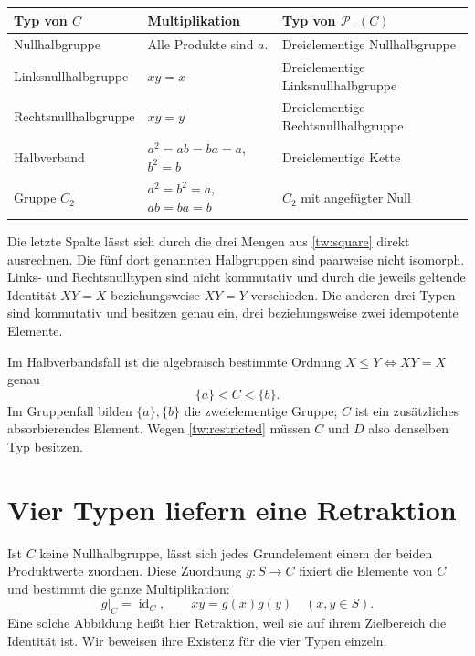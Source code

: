 \documentclass[a4paper,11pt]{article}
\newcommand{\Pp}[1]{\mathcal P_+(#1)}
\begin{document}
\begin{center}
\small
\begin{tabularx}{\linewidth}{@{}l X X@{}}
\toprule
Typ von \(C\) & Multiplikation & Typ von \(\Pp C\) \\
\midrule
Nullhalbgruppe & Alle Produkte sind \(a\).
 & Dreielementige Nullhalbgruppe \\
Linksnullhalbgruppe & \(xy=x\)
 & Dreielementige Linksnullhalbgruppe \\
Rechtsnullhalbgruppe & \(xy=y\)
 & Dreielementige Rechtsnullhalbgruppe \\
Halbverband & \(a^2=ab=ba=a\), \(b^2=b\)
 & Dreielementige Kette \\
Gruppe \(C_2\) & \(a^2=b^2=a\), \(ab=ba=b\)
 & \(C_2\) mit angefügter Null \\
\bottomrule
\end{tabularx}
\end{center}

Die letzte Spalte lässt sich durch die drei Mengen aus
\eqref{tw:square} direkt ausrechnen. Die fünf dort genannten
Halbgruppen sind paarweise nicht isomorph. Links- und Rechtsnulltypen
sind nicht kommutativ und durch die jeweils geltende Identität
\(XY=X\) beziehungsweise \(XY=Y\) verschieden. Die anderen drei
Typen sind kommutativ und besitzen genau ein, drei beziehungsweise
zwei idempotente Elemente.

Im Halbverbandsfall ist die algebraisch bestimmte Ordnung
\(X\le Y\iff XY=X\) genau
\[
 \{a\}<C<\{b\}.
\]
Im Gruppenfall bilden \(\{a\},\{b\}\) die zweielementige Gruppe;
\(C\) ist ein zusätzliches absorbierendes Element. Wegen
\eqref{tw:restricted} müssen \(C\) und \(D\) also denselben Typ
besitzen.

\section{Vier Typen liefern eine Retraktion}

Ist \(C\) keine Nullhalbgruppe, lässt sich jedes Grundelement einem
der beiden Produktwerte zuordnen. Diese Zuordnung \(g:S\to C\)
fixiert die Elemente von \(C\) und bestimmt die ganze Multiplikation:
\begin{equation}\label{tw:inflation}
 g|_C=\operatorname{id}_C,\qquad xy=g(x)g(y)\quad(x,y\in S).
\end{equation}
Eine solche Abbildung heißt hier Retraktion, weil sie auf ihrem
Zielbereich die Identität ist. Wir beweisen ihre Existenz für die vier
Typen einzeln.
\end{document}
